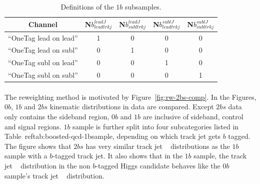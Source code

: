 \begin{table}[htb!]
\begin{center}
\caption{Definitions of the $1b$ subsamples.}
\begin{tabular}{c|c|c|c|c}
\hline
  Channel & N$b^{leadJ}_{leadtrkj}$ & N$b^{leadJ}_{subltrkj}$ & N$b^{sublJ}_{leadtrkj}$ & N$b^{sublJ}_{subltrkj}$ \\
  \hline
  ``OneTag lead on lead'' & 1 & 0 & 0 & 0 \\
  ``OneTag lead on subl'' & 0 & 1 & 0 & 0 \\
  ``OneTag subl on lead'' & 0 & 0 & 1 & 0 \\
  ``OneTag subl on subl'' & 0 & 0 & 0 & 1 \\
  \end{tabular}
\label{tab:boosted-qcd-1bsample}
\end{center}
\end{table}

\paragraph{}
The reweighting method is motivated by Figure~\ref{fig:rw-2bs-comp}.
In the Figures, 0$b$, $1b$ and $2bs$ kinematic distributions in data are compared.
Except $2bs$ data only contains the sideband region, 0$b$ and $1b$ are inclusive of sideband, control and signal regions.
$1b$ sample is further split into four subcategories listed in Table~ref{tab:boosted-qcd-1bsample}, depending on which track jet gets $b$ tagged.
The figure shows that $2bs$ has very similar track jet \pt~ distributions as the $1b$ sample with a $b$-tagged track jet.
It also shows that in the $1b$ sample, the track jet \pt~ distribution in the non $b$-tagged Higgs candidate behaves like the 0$b$ sample's track jet \pt~ distribution.

